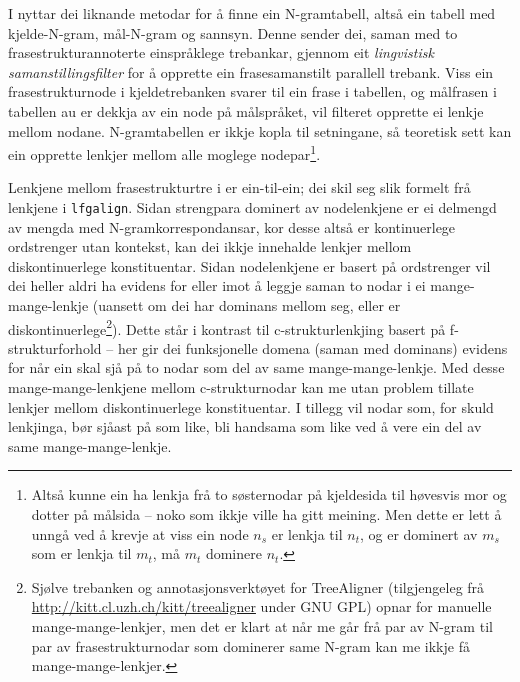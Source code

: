 \documentclass[11pt,a4paper,oneside,draft]{report}
\begin{document}
 I \citet{samuelsson2007apa} nyttar dei liknande metodar for å finne
 ein N-gramtabell, altså ein tabell med kjelde-N-gram, mål-N-gram og
 sannsyn. Denne sender dei, saman med to frasestrukturannoterte
 einspråklege trebankar, gjennom eit \emph{lingvistisk  samanstillingsfilter} for å opprette ein frasesamanstilt parallell
 trebank. Viss ein frasestrukturnode i kjeldetrebanken svarer til ein
 frase i tabellen, og målfrasen i tabellen au er dekkja av ein node på
 målspråket, vil filteret opprette ei lenkje mellom nodane.
 N-gramtabellen er ikkje kopla til setningane, så teoretisk sett kan
 ein opprette lenkjer mellom alle moglege nodepar\footnote{Altså kunne ein ha lenkja frå to søsternodar på kjeldesida til
        høvesvis mor og dotter på målsida -- noko som ikkje ville ha
        gitt meining. Men dette er lett å unngå ved å krevje at viss
        ein node $n_s$ er lenkja til $n_t$, og er dominert av $m_s$
        som er lenkja til $m_t$, må $m_t$ dominere $n_t$. }.

 Lenkjene mellom frasestrukturtre i \citet{samuelsson2007apa} er
 ein-til-ein; dei skil seg slik formelt frå lenkjene i
 \texttt{lfgalign}. Sidan strengpara dominert av nodelenkjene er ei delmengd
 av mengda med N-gramkorrespondansar, kor desse altså er kontinuerlege
 ordstrenger utan kontekst, kan dei ikkje innehalde lenkjer mellom
 diskontinuerlege konstituentar. Sidan nodelenkjene er basert på
 ordstrenger vil dei heller aldri ha evidens for eller imot å leggje
 saman to nodar i ei mange-mange-lenkje (uansett om dei har dominans
 mellom seg, eller er diskontinuerlege\footnote{Sjølve trebanken \citep{samuelsson2006pap} og
        annotasjonsverktøyet for TreeAligner (tilgjengeleg frå
        \href{http://kitt.cl.uzh.ch/kitt/treealigner}{http://kitt.cl.uzh.ch/kitt/treealigner} under GNU GPL) opnar
        for manuelle mange-mange-lenkjer, men det er klart at når me
        går frå par av N-gram til par av frasestrukturnodar som
        dominerer same N-gram kan me ikkje få mange-mange-lenkjer. }). Dette står i kontrast
 til c-strukturlenkjing basert på f-strukturforhold -- her gir dei
 funksjonelle domena (saman med dominans) evidens for når ein skal sjå
 på to nodar som del av same mange-mange-lenkje.  Med desse
 mange-mange-lenkjene mellom c-strukturnodar kan me utan problem
 tillate lenkjer mellom diskontinuerlege konstituentar. I tillegg vil
 nodar som, for skuld lenkjinga, bør sjåast på som like, bli handsama
 som like ved å vere ein del av same mange-mange-lenkje.
 
\end{document}
